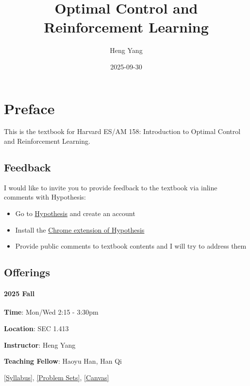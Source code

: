 \documentclass[
]{book}
\title{Optimal Control and Reinforcement Learning}
\author{Heng Yang}
\date{2025-09-30}
\theoremstyle{definition}
\theoremstyle{definition}
\theoremstyle{definition}
\theoremstyle{definition}
\theoremstyle{remark}
\begin{document}
\maketitle

{
\setcounter{tocdepth}{1}
\tableofcontents
}
\chapter*{Preface}\label{preface}

This is the textbook for Harvard ES/AM 158: Introduction to Optimal Control and Reinforcement Learning.

\section*{Feedback}\label{feedback}

I would like to invite you to provide feedback to the textbook via inline comments with Hypothesis:

\begin{itemize}
\item
  Go to \href{https://hypothes.is}{Hypothesis} and create an account
\item
  Install the \href{https://chrome.google.com/webstore/detail/hypothesis-web-pdf-annota/bjfhmglciegochdpefhhlphglcehbmek}{Chrome extension of Hypothesis}
\item
  Provide public comments to textbook contents and I will try to address them
\end{itemize}

\section*{Offerings}\label{offerings}

\subsubsection*{2025 Fall}\label{fall}

\textbf{Time}: Mon/Wed 2:15 - 3:30pm

\textbf{Location}: SEC 1.413

\textbf{Instructor}: Heng Yang

\textbf{Teaching Fellow}: Haoyu Han, Han Qi

\href{https://docs.google.com/document/d/1dIRYQZZJDx8K2q1TrodDDLg-bKJWWmj7o7yzOGlIs7o/edit?usp=sharing}{{[}Syllabus{]}}, \href{https://github.com/ComputationalRobotics/2025-ES-AM-158-PSET}{{[}Problem Sets{]}}, \href{https://canvas.harvard.edu/courses/153422}{{[}Canvas{]}}
\end{document}
